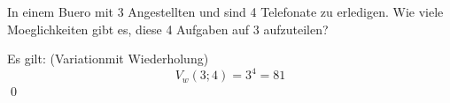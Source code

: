 \documentclass{abgabe}
\begin{document}
\begin{questions}
    \question
    In einem Buero mit 3 Angestellten und sind 4 Telefonate zu erledigen. 
    Wie viele Moeglichkeiten gibt es, diese 4 Aufgaben auf 3 aufzuteilen?
    \begin{solution}
        Es gilt: (Variationmit Wiederholung)
        \[ 
            V_w(3;4) = 3^4 = 81
        \] 
        \qed
    \end{solution}
\end{questions}
\end{document}
